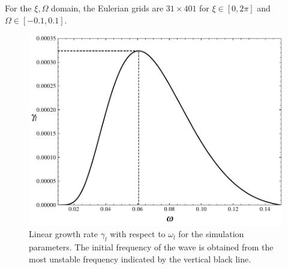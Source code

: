 For the $\xi,\Omega$ domain, the Eulerian grids are $31 \times 401$ for $\xi \in [0,2\pi]$ and $\Omega \in [-0.1,0.1]$.
\begin{figure}[htbp]
    \centering
    \includegraphics[scale=0.5]{cpc_img/fig_gamma1d.pdf}
    \caption{Linear growth rate $\gamma_l$ with respect to $\omega_l$ for the simulation parameters. The initial frequency of the wave is obtained from the most unstable frequency indicated by the vertical black line.}
    \label{fig.para}
\end{figure}

